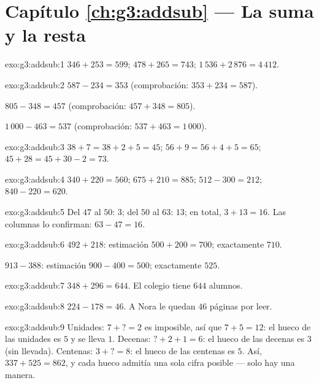 \section*{Capítulo \ref{ch:g3:addsub} --- La suma y la resta}

\begin{solution}{exo:g3:addsub:1}
$346 + 253 = 599$; \quad
$478 + 265 = 743$; \quad
$1\,536 + 2\,876 = 4\,412$.
\end{solution}

\begin{solution}{exo:g3:addsub:2}
$587 - 234 = 353$ (comprobación: $353 + 234 = 587$).

$805 - 348 = 457$ (comprobación: $457 + 348 = 805$).

$1\,000 - 463 = 537$ (comprobación: $537 + 463 = 1\,000$).
\end{solution}

\begin{solution}{exo:g3:addsub:3}
$38 + 7 = 38 + 2 + 5 = 45$; \quad
$56 + 9 = 56 + 4 + 5 = 65$; \quad
$45 + 28 = 45 + 30 - 2 = 73$.
\end{solution}

\begin{solution}{exo:g3:addsub:4}
$340 + 220 = 560$; \quad $675 + 210 = 885$; \quad
$512 - 300 = 212$; \quad $840 - 220 = 620$.
\end{solution}

\begin{solution}{exo:g3:addsub:5}
Del $47$ al $50$: $3$; del $50$ al $63$: $13$; en total,
$3 + 13 = 16$. Las columnas lo confirman: $63 - 47 = 16$.
\end{solution}

\begin{solution}{exo:g3:addsub:6}
$492 + 218$: estimación $500 + 200 = 700$; exactamente $710$.

$913 - 388$: estimación $900 - 400 = 500$; exactamente $525$.
\end{solution}

\begin{solution}{exo:g3:addsub:7}
$348 + 296 = 644$. El colegio tiene $644$ alumnos.
\end{solution}

\begin{solution}{exo:g3:addsub:8}
$224 - 178 = 46$. A Nora le quedan $46$ páginas por leer.
\end{solution}

\begin{solution}{exo:g3:addsub:9}
Unidades: $7 + \text{?} = 2$ es imposible, así que $7 + 5 = 12$: el hueco de las
unidades es $5$ y se lleva $1$. Decenas: $\text{?} + 2 + 1 = 6$: el hueco de las decenas
es $3$ (sin llevada). Centenas: $3 + \text{?} = 8$: el hueco de las centenas es
$5$. Así, $337 + 525 = 862$, y cada hueco admitía una sola
cifra posible --- solo hay una manera.
\end{solution}

